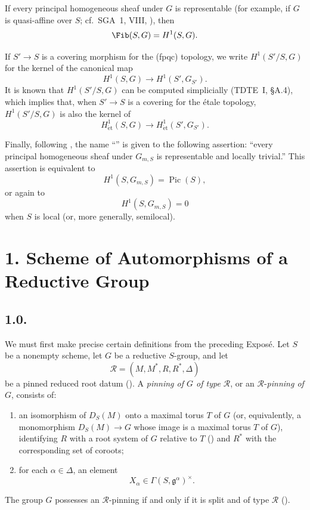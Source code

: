 If every principal homogeneous sheaf under \(G\) is representable
\textup{(for example, if \(G\) is quasi-affine over \(S\); cf.\ SGA~1,
VIII, )}, then
\[
  \Fib(S,G)=H^1(S,G).
\]

If \(S'\to S\) is a covering morphism for the \textup{(fpqc)}
topology, we write \(H^1(S'/S,G)\) for the kernel of the canonical map
\[
  H^1(S,G)\longrightarrow H^1(S',G_{S'}).
\]
It is known that \(H^1(S'/S,G)\) can be computed simplicially
\textup{(TDTE~I, \S A.4)}, which implies that, when \(S'\to S\) is a
covering for the étale topology, \(H^1(S'/S,G)\) is also the kernel of
\[
  H^1_{\mathrm{\acute et}}(S,G)
  \longrightarrow
  H^1_{\mathrm{\acute et}}(S',G_{S'}).
\]

Finally, following , the name ``'' is given to
the following assertion: ``every principal homogeneous sheaf under
\(G_{m,S}\) is representable and locally trivial.'' This assertion is
equivalent to
\[
  H^1(S,G_{m,S})=\operatorname{Pic}(S),
\]
or again to
\[
  H^1(S,G_{m,S})=0
\]
when \(S\) is local \textup{(or, more generally, semilocal)}.

\section*{1. Scheme of Automorphisms of a Reductive Group}

\subsection*{1.0.}
We must first make precise certain definitions from the preceding
Exposé. Let \(S\) be a nonempty scheme, let \(G\) be a reductive
\(S\)-group, and let
\[
  \mathscr R=(M,M^*,R,R^*,\Delta)
\]
be a pinned reduced root datum \textup{()}. A
\emph{pinning of \(G\) of type \(\mathscr R\)}, or an
\(\mathscr R\)-\emph{pinning of \(G\)}, consists of:
\begin{enumerate}
\item[(i)] an isomorphism of \(D_S(M)\) onto a maximal torus \(T\) of
  \(G\) \textup{(or, equivalently, a monomorphism
  \(D_S(M)\to G\) whose image is a maximal torus \(T\) of \(G\))},
  identifying \(R\) with a root system of \(G\) relative to \(T\)
  \textup{()} and \(R^*\) with the corresponding set of
  coroots;
\item[(ii)] for each \(\alpha\in\Delta\), an element
  \[
    X_\alpha\in\Gamma(S,\mathfrak g^\alpha)^\times.
  \]
\end{enumerate}
The group \(G\) possesses an \(\mathscr R\)-pinning if and only if it
is split and of type \(\mathscr R\) \textup{()}.

